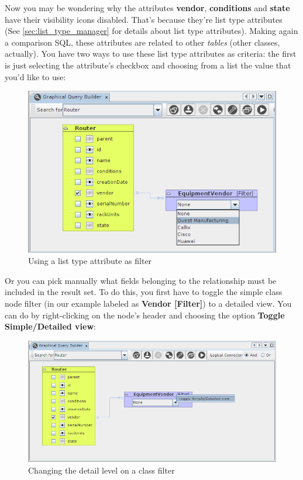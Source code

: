 \documentclass[a4paper]{article}
\begin{document}
	Now you may be wondering why the attributes \textbf{vendor}, \textbf{conditions} and \textbf{state} have their visibility icons disabled. That's because they're list type attributes (See \ref{sec:list_type_manager} for details about list type attributes).  Making again a comparison SQL, these attributes are related to other \textit{tables} (other classes, actually). You have two ways to use these list type attributes as criteria: the first is just selecting the attribute's checkbox and choosing from a list the value that you'd like to use:
	\begin{figure}[h!]
		\centering
		\includegraphics[width=0.9\linewidth]{img/query_vendor_selected.png}
		\caption{Using a list type attribute as filter}
		\label{fig:query_vendor_selected}
	\end{figure}
	
	Or you can pick manually what fields belonging to the relationship must be included in the result set. To do this, you first have to toggle the simple class node filter (in our example labeled as \textbf{Vendor [Filter]}) to a detailed view. You can do by right-clicking on the node's header and choosing the option \textbf{Toggle Simple/Detailed view}:
	\begin{figure}[h!]
		\centering
		\includegraphics[width=0.9\linewidth]{img/query_toggle_detail_view.png}
		\caption{Changing the detail level on a class filter}
		\label{fig:query_toggle_detail_view}
	\end{figure}
	
\end{document}
